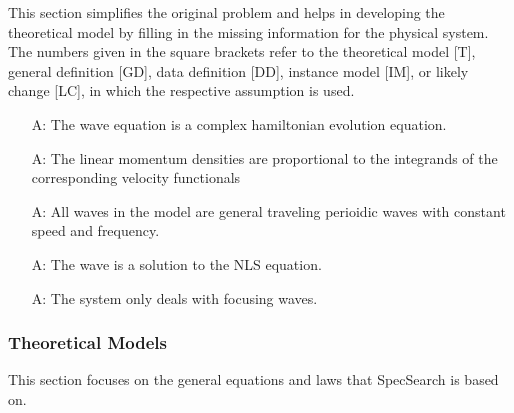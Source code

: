 \documentclass[12pt]{article}
\newcounter{assumpnum} %
\begin{document}
This section simplifies the original problem and helps in developing the
theoretical model by filling in the missing information for the physical
system. The numbers given in the square brackets refer to the theoretical model
[T], general definition [GD], data definition [DD], instance model [IM], or
likely change [LC], in which the respective assumption is used.

\begin{itemize}

\item[A\refstepcounter{assumpnum}\theassumpnum \label{A_meaningfulLabel}:]The 
wave equation is a complex hamiltonian evolution equation. 
\item[A\refstepcounter{assumpnum}\theassumpnum \label{A_meaningfulLabel}:]The 
linear momentum densities are proportional to the integrands of the 
corresponding velocity functionals 
\item[A\refstepcounter{assumpnum}\theassumpnum \label{A_meaningfulLabel}:]All 
waves in the model are general traveling perioidic waves with constant speed 
and frequency. 
\item[A\refstepcounter{assumpnum}\theassumpnum \label{A_meaningfulLabel}:]The 
wave is a solution to the NLS equation.
\item[A\refstepcounter{assumpnum}\theassumpnum \label{A_meaningfulLabel}:]The 
system only deals with focusing waves.

\end{itemize}

\subsubsection{Theoretical Models}\label{sec_theoretical}

This section focuses on the general equations and laws that SpecSearch is based
on. 

~\newline
\end{document}
